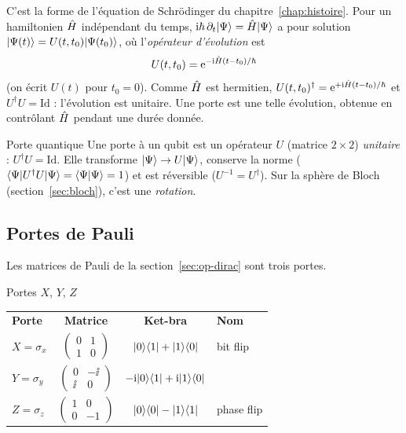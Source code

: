 C'est la forme de l'équation de Schrödinger du chapitre~\ref{chap:histoire}. Pour un hamiltonien
$\hat{H}$ indépendant du temps, $\mathrm{i}\hbar\,\partial_t|\Psi\rangle=\hat{H}|\Psi\rangle$ a pour solution
$|\Psi(t)\rangle=U(t,t_0)|\Psi(t_0)\rangle$, où l'\emph{opérateur d'évolution} est
\[
  U(t,t_0)=\mathrm{e}^{-\mathrm{i}\hat{H}(t-t_0)/\hbar}
\]
(on écrit $U(t)$ pour $t_0=0$). Comme $\hat{H}$ est hermitien,
$U(t,t_0)^\dagger=\mathrm{e}^{+\mathrm{i}\hat{H}(t-t_0)/\hbar}$ et $U^\dagger U=\mathrm{Id}$ : l'évolution est unitaire. Une
porte est une telle évolution, obtenue en contrôlant $\hat{H}$ pendant une durée donnée.

\begin{definition}{Porte quantique}
Une porte à un qubit est un opérateur $U$ (matrice $2\times2$) \emph{unitaire} :
$U^\dagger U=\mathrm{Id}$. Elle transforme $|\Psi\rangle\to U|\Psi\rangle$, conserve la norme
($\langle \Psi|U^\dagger U|\Psi\rangle=\langle \Psi|\Psi\rangle=1$) et est réversible
($U^{-1}=U^\dagger$). Sur la sphère de Bloch (section~\ref{sec:bloch}), c'est une
\emph{rotation}.
\end{definition}

\subsection{Portes de Pauli}\label{sec:pauli}

Les matrices de Pauli de la section~\ref{sec:op-dirac} sont trois portes.

\begin{definition}{Portes $X$, $Y$, $Z$}
\begin{center}
\renewcommand{\arraystretch}{1}
\begin{tabular}{@{}lccl@{}}
\textbf{Porte} & \textbf{Matrice} & \textbf{Ket-bra} & \textbf{Nom} \\[0.8ex]
$X=\sigma_x$ & $\begin{pmatrix}0 & 1\\ 1 & 0\end{pmatrix}$
  & $|0\rangle\langle 1|+|1\rangle\langle 0|$ & bit flip \\[2.2ex]
$Y=\sigma_y$ & $\begin{pmatrix}0 & -\ii\\ \ii & 0\end{pmatrix}$
  & $-\mathrm{i}|0\rangle\langle 1|+\mathrm{i}|1\rangle\langle 0|$ &  \\[2.2ex]
$Z=\sigma_z$ & $\begin{pmatrix}1 & 0\\ 0 & -1\end{pmatrix}$
  & $|0\rangle\langle 0|-|1\rangle\langle 1|$ & phase flip \\
\end{tabular}
\end{center}
\end{definition}

